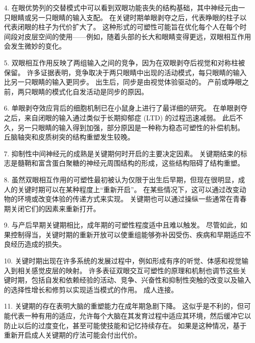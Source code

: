 4. 在眼优势列的交替模式中可以看到双眼功能丧失的结构基础，其中神经元由一只眼睛或另一只眼睛的输入支配。 在关键时期单眼剥夺之后，代表睁眼的柱子以代表闭眼的柱子为代价扩大了。 这种形式的可塑性可能旨在优化每个人在每个时间段对皮层空间的使用——例如，随着头部的长大和眼睛变得更远，双眼相互作用会发生微妙的变化。 

5. 双眼相互作用反映了两组输入之间的竞争，因为在双眼剥夺后视觉和对称柱被保留。 许多证据表明，竞争取决于两只眼睛中出现的活动模式，每只眼睛的输入比另一只眼睛的输入更同步。 出生后，同步是由视觉体验驱动的。 产前或睁眼之前，两只眼睛的模式化自发活动是同步的原因。 

6. 单眼剥夺效应背后的细胞机制已在小鼠身上进行了最详细的研究。 在单眼剥夺之后，来自闭眼的输入通过类似于长期抑郁症 (LTD) 的过程迅速减弱。 此后不久，另一只眼睛的输入得到加强，部分原因是一种称为稳态可塑性的补偿机制。 丘脑轴突和皮质树突的结构重塑发生较晚。 

7. 抑制性中间神经元的成熟是关键期何时开启的主要决定因素。 关键期结束的标志是髓鞘和富含蛋白聚糖的神经元周围结构的形成，这些结构阻碍了结构重塑。 

8. 虽然双眼相互作用的可塑性最初被认为仅限于出生后早期，但现在很明显，成人的关键时期可以在某种程度上“重新开启”。 在某些情况下，这可以通过改变动物的环境或改变体验的传递方式来实现。 关键期也可以通过操纵一些通常在青春期关闭它们的因素来重新打开。 

9. 与产后早期关键期相比，成年期的可塑性程度适中且难以触发。 尽管如此，如果控制得当，关键时期的重新开放可以使重组能够弥补因受伤、疾病和早期适应不良经历造成的损失。 

10. 关键时期出现在许多系统的发展过程中，例如形成有序的听觉、体感和视觉输入到相关感觉皮层的映射。 许多表征双眼交互可塑性的原理和机制也调节这些关键时期，包括自发和依赖经验的活动、竞争、兴奋性和抑制性突触的改变以及输入的选择性增长和修剪以实现适当模式的作用。 成人连接。

11. 关键期的存在表明大脑的重塑能力在成年期急剧下降。 这似乎是不利的，但可能代表一种有用的适应，允许每个大脑在其发育过程中适应其环境，然后缓冲它以防止以后的过度变化，甚至可能使技能和记忆持续存在。 如果是这种情况，基于重新开启成人关键期的疗法可能会付出代价。


